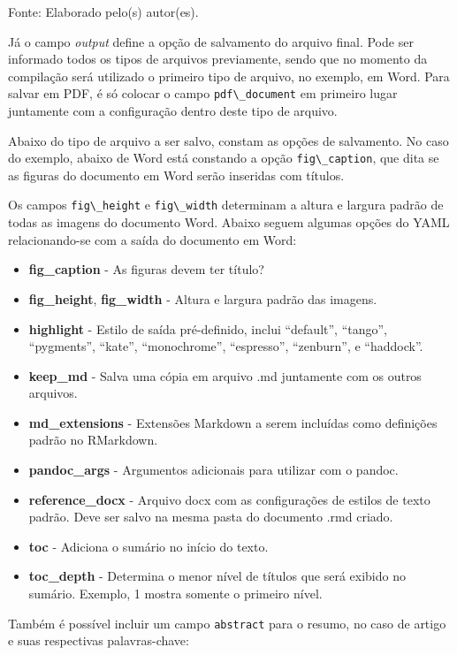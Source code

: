 \documentclass[12pt,brazil,oneside]{book}
\begin{document}
Fonte: Elaborado pelo(s) autor(es).

Já o campo \emph{output} define a opção de salvamento do arquivo final.
Pode ser informado todos os tipos de arquivos previamente, sendo que no
momento da compilação será utilizado o primeiro tipo de arquivo, no
exemplo, em Word. Para salvar em PDF, é só colocar o campo
\texttt{pdf\textbackslash{}\_document} em primeiro lugar juntamente com
a configuração dentro deste tipo de arquivo.

Abaixo do tipo de arquivo a ser salvo, constam as opções de salvamento.
No caso do exemplo, abaixo de Word está constando a opção
\texttt{fig\textbackslash{}\_caption}, que dita se as figuras do
documento em Word serão inseridas com títulos.

Os campos \texttt{fig\textbackslash{}\_height} e
\texttt{fig\textbackslash{}\_width} determinam a altura e largura padrão
de todas as imagens do documento Word. Abaixo seguem algumas opções do
YAML relacionando-se com a saída do documento em Word:

\begin{itemize}
\item
  \textbf{fig\_caption} - As figuras devem ter título?
\item
  \textbf{fig\_height}, \textbf{fig\_width} - Altura e largura padrão
  das imagens.
\item
  \textbf{highlight} - Estilo de saída pré-definido, inclui ``default'',
  ``tango'', ``pygments'', ``kate'', ``monochrome'', ``espresso'',
  ``zenburn'', e ``haddock''.
\item
  \textbf{keep\_md} - Salva uma cópia em arquivo .md juntamente com os
  outros arquivos.
\item
  \textbf{md\_extensions} - Extensões Markdown a serem incluídas como
  definições padrão no RMarkdown.
\item
  \textbf{pandoc\_args} - Argumentos adicionais para utilizar com o
  pandoc.
\item
  \textbf{reference\_docx} - Arquivo docx com as configurações de
  estilos de texto padrão. Deve ser salvo na mesma pasta do documento
  .rmd criado.
\item
  \textbf{toc} - Adiciona o sumário no início do texto.
\item
  \textbf{toc\_depth} - Determina o menor nível de títulos que será
  exibido no sumário. Exemplo, 1 mostra somente o primeiro nível.
\end{itemize}

Também é possível incluir um campo \texttt{abstract} para o resumo, no
caso de artigo e suas respectivas palavras-chave:
\end{document}
